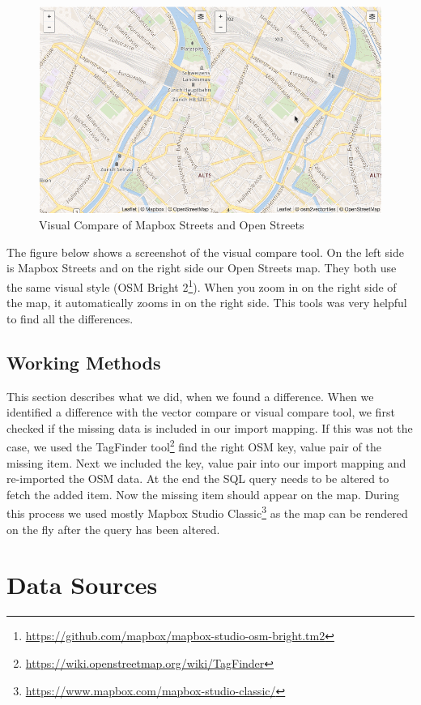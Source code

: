\begin{figure}[H]
  \centering
  \includegraphics[width=1\textwidth]{images/visual_compare.png}
  \caption{Visual Compare of Mapbox Streets and Open Streets}
\end{figure}

The figure below shows a screenshot of the visual compare tool. On the left side is Mapbox Streets and on the right side our Open Streets map. They both use the same visual style (OSM Bright 2\footnote{\url{https://github.com/mapbox/mapbox-studio-osm-bright.tm2}}). When you zoom in on the right side of the map, it automatically zooms in on the right side. This tools was very helpful to find all the differences.

\subsection{Working Methods}
This section describes what we did, when we found a difference. When we identified a difference with the vector compare or visual compare tool, we first checked if the missing data is included in our import mapping. If this was not the case, we used the TagFinder tool\footnote{\url{https://wiki.openstreetmap.org/wiki/TagFinder}} find the right OSM key, value pair of the missing item. Next we included the key, value pair into our import mapping and re-imported the OSM data. At the end the SQL query needs to be altered to fetch the added item. Now the missing item should appear on the map. During this process we used mostly Mapbox Studio Classic\footnote{\url{https://www.mapbox.com/mapbox-studio-classic/}} as the map can be rendered on the fly after the query has been altered.

\section{Data Sources}
\label{data-sources}

